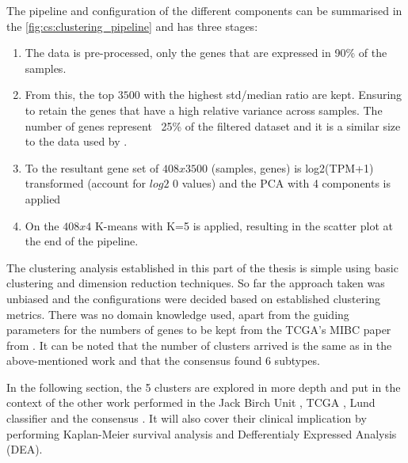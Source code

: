 The pipeline and configuration of the different components can be summarised in the \cref{fig:cs:clustering_pipeline} and has three stages:
\begin{enumerate}
    \item The data is pre-processed, only the genes that are expressed in 90\% of the samples. \item From this, the top $3500$ with the highest std/median ratio are kept. Ensuring to retain the genes that have a high relative variance across samples. The number of genes represent ~25\% of the filtered dataset and it is a similar size to the data used by \citet{Robertson2017-mg}.
    \item To the resultant gene set of $408x3500$ (samples, genes) is log2(TPM+1) transformed (account for $log2$ 0 values) and the PCA with 4 components is applied
    \item On the $408x4$ K-means with K=5 is applied, resulting in the scatter plot at the end of the pipeline.
\end{enumerate}

The clustering analysis established in this part of the thesis is simple using basic clustering and dimension reduction techniques. So far the approach taken was unbiased and the configurations were decided based on established clustering metrics. There was no domain knowledge used, apart from the guiding parameters for the numbers of genes to be kept from the TCGA's MIBC paper from \citet{Robertson2017-mg}. It can be noted that the number of clusters arrived is the same as in the above-mentioned work and that the consensus \citet{Kamoun2020-tj} found 6 subtypes. 

In the following section, the 5 clusters are explored in more depth and put in the context of the other work performed in the Jack Birch Unit \citet{Baker2022-bj}, TCGA \citet{Robertson2017-mg}, Lund classifier \citet{Marzouka2018-ge} and the consensus \citet{Kamoun2020-tj}. It will also cover their clinical implication by performing Kaplan-Meier survival analysis and Defferentialy Expressed Analysis (DEA).




